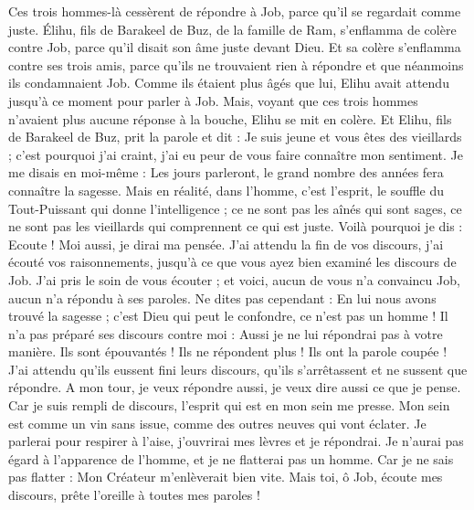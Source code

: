 \begin{multicols}{2}
\VerseOne{}Ces trois hommes-là cessèrent de répondre à Job, parce qu'il se regardait comme juste.
Élihu, fils de Barakeel de Buz, de la famille de Ram, s'enflamma de colère contre Job, parce qu'il disait son âme juste devant Dieu.
Et sa colère s'enflamma contre ses trois amis, parce qu'ils ne trouvaient rien à répondre et que néanmoins ils condamnaient Job.
Comme ils étaient plus âgés que lui, Elihu avait attendu jusqu'à ce moment pour parler à Job.
Mais, voyant que ces trois hommes n'avaient plus aucune réponse à la bouche, Elihu se mit en colère.
Et Elihu, fils de Barakeel de Buz, prit la parole et dit : Je suis jeune et vous êtes des vieillards ; c'est pourquoi j'ai craint, j'ai eu peur de vous faire connaître mon sentiment.
Je me disais en moi-même : Les jours parleront, le grand nombre des années fera connaître la sagesse.
Mais en réalité, dans l'homme, c'est l'esprit, le souffle du Tout-Puissant qui donne l'intelligence ;
ce ne sont pas les aînés qui sont sages, ce ne sont pas les vieillards qui comprennent ce qui est juste.
Voilà pourquoi je dis : Ecoute ! Moi aussi, je dirai ma pensée.
J'ai attendu la fin de vos discours, j'ai écouté vos raisonnements, jusqu'à ce que vous ayez bien examiné les discours de Job.
J'ai pris le soin de vous écouter ; et voici, aucun de vous n'a convaincu Job, aucun n'a répondu à ses paroles.
Ne dites pas cependant : En lui nous avons trouvé la sagesse ; c'est Dieu qui peut le confondre, ce n'est pas un homme !
Il n'a pas préparé ses discours contre moi : Aussi je ne lui répondrai pas à votre manière.
Ils sont épouvantés ! Ils ne répondent plus ! Ils ont la parole coupée !
J'ai attendu qu'ils eussent fini leurs discours, qu'ils s'arrêtassent et ne sussent que répondre.
A mon tour, je veux répondre aussi, je veux dire aussi ce que je pense.
Car je suis rempli de discours, l'esprit qui est en mon sein me presse.
Mon sein est comme un vin sans issue, comme des outres neuves qui vont éclater.
Je parlerai pour respirer à l'aise, j'ouvrirai mes lèvres et je répondrai.
Je n'aurai pas égard à l'apparence de l'homme, et je ne flatterai pas un homme.
Car je ne sais pas flatter : Mon Créateur m'enlèverait bien vite.
\VerseOne{}Mais toi, ô Job, écoute mes discours, prête l'oreille à toutes mes paroles !

\end{multicols}
